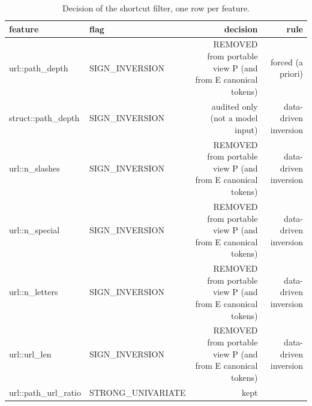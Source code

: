 \begin{table}[t]
\centering
\scriptsize
\caption{Decision of the shortcut filter, one row per feature.}
\label{tab:rev_R8_shortcut_decisions_one_row_per_feature}
\begin{tabular}{llrr}
\toprule
feature & flag & decision & rule \\
\midrule
url::path\_depth & SIGN\_INVERSION & REMOVED from portable view P (and from E canonical tokens) & forced (a priori) \\
struct::path\_depth & SIGN\_INVERSION & audited only (not a model input) & data-driven inversion \\
url::n\_slashes & SIGN\_INVERSION & REMOVED from portable view P (and from E canonical tokens) & data-driven inversion \\
url::n\_special & SIGN\_INVERSION & REMOVED from portable view P (and from E canonical tokens) & data-driven inversion \\
url::n\_letters & SIGN\_INVERSION & REMOVED from portable view P (and from E canonical tokens) & data-driven inversion \\
url::url\_len & SIGN\_INVERSION & REMOVED from portable view P (and from E canonical tokens) & data-driven inversion \\
url::path\_url\_ratio & STRONG\_UNIVARIATE & kept &  \\
\bottomrule
\end{tabular}
\end{table}